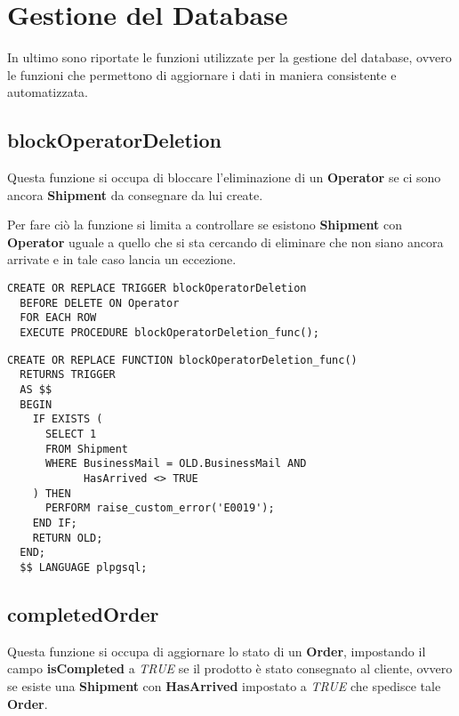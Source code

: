 \section{Gestione del Database}

In ultimo sono riportate le funzioni utilizzate per la gestione del database, ovvero le funzioni che permettono di aggiornare i dati in maniera consistente e automatizzata.

\subsection{\textbf{blockOperatorDeletion}}

Questa funzione si occupa di bloccare l'eliminazione di un \textbf{Operator} se ci sono ancora \textbf{Shipment} da consegnare da lui create.

Per fare ciò la funzione si limita a controllare se esistono \textbf{Shipment} con \textbf{Operator} uguale a quello che si sta cercando di eliminare che non siano ancora arrivate e in tale caso lancia un eccezione.

\begin{lstlisting}[caption={Trigger per implementare \textbf{blockOperatorDeletion}}]
  CREATE OR REPLACE TRIGGER blockOperatorDeletion
  BEFORE DELETE ON Operator
  FOR EACH ROW
  EXECUTE PROCEDURE blockOperatorDeletion_func();
\end{lstlisting}

\begin{lstlisting}[caption={Funzione \textbf{blockOperatorDeletion}}]
  CREATE OR REPLACE FUNCTION blockOperatorDeletion_func()
  RETURNS TRIGGER
  AS $$
  BEGIN
    IF EXISTS (
      SELECT 1
      FROM Shipment
      WHERE BusinessMail = OLD.BusinessMail AND
            HasArrived <> TRUE
    ) THEN
      PERFORM raise_custom_error('E0019');
    END IF;
    RETURN OLD;
  END;
  $$ LANGUAGE plpgsql;
\end{lstlisting}

\subsection{\textbf{completedOrder}}

Questa funzione si occupa di aggiornare lo stato di un \textbf{Order}, impostando il campo \textbf{isCompleted} a \textit{TRUE} se il prodotto è stato consegnato al cliente, ovvero se esiste una \textbf{Shipment} con \textbf{HasArrived} impostato a \textit{TRUE} che spedisce tale \textbf{Order}.

